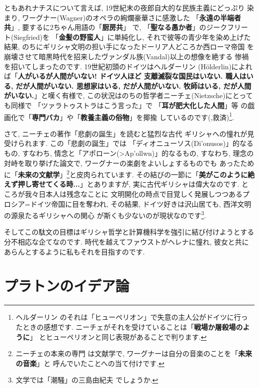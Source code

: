 ともあれナチスについて言えば, 19世紀末の夜郎自大的な民族主義にどっぷり
染まり, ワーグナー(Wagner)のオペラの絢爛豪華さに感激した
「\textbf{永遠の半端者共}」, 要するに2ちゃん用語の「\textbf{厨房共}」
で, 「\textbf{聖なる愚か者}」のジークフリート(Siegfried)を
「\textbf{金髪の野蛮人}」に単純化し, それで彼等の青少年を染め上げた
結果, のちにギリシャ文明の担い手になったドーリア人どころか西ローマ帝国
を崩壊させて暗黒時代を招来したヴァンダル族(Vandal)以上の想像を絶する
惨禍を招いてしまったのです. 19世紀初頭のドイツはヘルダーリン
(H\"olderlin)によれば「\textbf{人がいるが人間がいない! ドイツ人ほど
支離滅裂な国民はいない. 職人はいる, だが人間がいない. 思想家はいる,
 だが人間がいない. 牧師はいる, だが人間がいない.}」と嘆く有様で,
 この状況はのちの哲学者ニーチェ(Nietzsche)にとっても同様で
「ツァラトゥストラはこう言った」で 「\textbf{耳が肥大化した人間}」等
の戯画化で「\textbf{専門バカ}」や「\textbf{教養主義の俗物}」を揶揄
しているのです(\cite{ツァラトゥストラ},救済)\footnote{ヘルダーリン
のそれは「ヒューペリオン」で失意の主人公がドイツに行ったときの感想です.
 ニーチェがそれを受けていることは「\textbf{戦場か屠殺場のように}」
 とヒューペリオンと同じ表現があることで判ります.}.
\newline

さて, ニーチェの著作「悲劇の誕生」\cite{悲劇の誕生}を読むと猛烈な古代
ギリシャへの憧れが見受けられます. この「悲劇の誕生」では
「ディオニューソス(\textgreek{Di'onusos})」的なるもの, すなわち,
情念と「アポローン(\textgreek{>Ap'ollwn})」的なるもの, すなわち,
 理念の対峙を取り挙げた論文で, ワーグナーの楽劇をよいしょするものでも
あったために「\textbf{未来の文献学}」\footnote{ニーチェの本来の専門
は文献学で, ワーグナーは自分の音楽のことを「\textbf{未来の音楽}」と
呼んでいたことへの当て付けです.}と皮肉られています. その結びの一節に「\textbf{美がこのように絶えず押し寄せてくる時...}」とありますが,
 実に古代ギリシャは偉大なのです. ところが我々日本人は残念なことに
文明開化の時点で目覚しく発展しつつあるプロシア=ドイツ帝国に目を奪われ,
 その結果, ドイツ好きは沢山居ても, 西洋文明の源泉たるギリシャへの関心
が斯くも少ないのが現状なのです\footnote{文学では「潮騒」の三島由紀夫
でしょうか.}.
\newline

そしてこの駄文の目標はギリシャ哲学と計算機科学を強引に結び付けようとする
分不相応な企てなのです. 時代を越えてファウストがヘレナに憧れ, 彼女と共に
あらんとするように私もそれを目指すのです.

\section{プラトンのイデア論}


